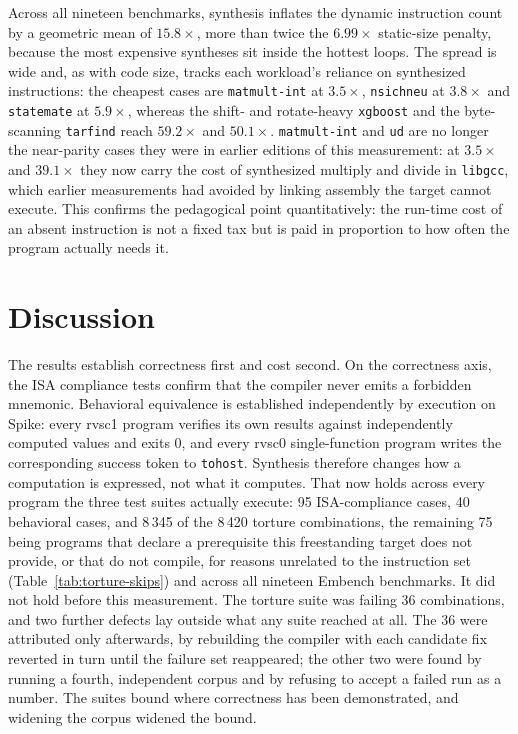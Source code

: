 Across all nineteen benchmarks, synthesis inflates the dynamic instruction count by a geometric mean
of $15.8\times$, more than twice the $6.99\times$ static-size penalty, because the most expensive
syntheses sit inside the hottest loops. The spread is wide and, as with code size, tracks each
workload's reliance on synthesized instructions: the cheapest cases are \texttt{matmult-int} at
$3.5\times$, \texttt{nsichneu} at $3.8\times$ and \texttt{statemate} at $5.9\times$, whereas the
shift- and rotate-heavy \texttt{xgboost} and the byte-scanning \texttt{tarfind} reach $59.2\times$ and
$50.1\times$. \texttt{matmult-int} and \texttt{ud} are no longer the near-parity cases they were in
earlier editions of this measurement: at $3.5\times$ and $39.1\times$ they now carry the cost of
synthesized multiply and divide in \texttt{libgcc}, which earlier measurements had avoided by linking
assembly the target cannot execute. This confirms the pedagogical point quantitatively: the run-time
cost of an absent instruction is not a fixed tax but is paid in proportion to how often the program
actually needs it.

\section{Discussion}

The results establish correctness first and cost second. On the correctness axis, the ISA compliance
tests confirm that the compiler never emits a forbidden mnemonic. Behavioral equivalence is
established independently by execution on Spike: every rvsc1 program verifies its own results against
independently computed values and exits 0, and every rvsc0 single-function program writes the
corresponding success token to \texttt{tohost}. Synthesis therefore changes how a computation is
expressed, not what it computes. That now holds across every program the three test suites actually
execute: 95 ISA-compliance cases, 40 behavioral cases, and 8\,345 of the 8\,420 torture
combinations, the remaining 75 being programs that declare a prerequisite this freestanding target
does not provide, or that do not compile, for reasons unrelated to the instruction set
(Table~\ref{tab:torture-skips}) and across all nineteen Embench benchmarks. It did not hold before
this measurement. The torture suite was failing 36 combinations, and two further defects lay outside
what any suite reached at all. The 36 were attributed only afterwards, by rebuilding the compiler with
each candidate fix reverted in turn until the failure set reappeared; the other two were found by
running a fourth, independent corpus and by refusing to accept a failed run as a number. The suites
bound where correctness has been demonstrated, and widening the corpus widened the bound.

